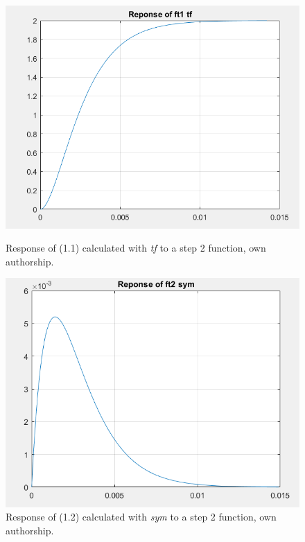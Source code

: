 \documentclass[a4paper,12pt]{article}
\begin{document}
\begin{figure}[H]
    \centering
    \begin{minipage}[b]{0.40\linewidth}
        \centering
        \includegraphics[width=\linewidth]{fonts_lab_1/tf1_response.png}
        \caption{Response of (1.1) calculated with \textit{tf} to a step 2 function, own authorship.}
        \label{fig:tf1-response}
    \end{minipage}
    \hspace{0.05\linewidth} %
    \begin{minipage}[b]{0.40\linewidth}
        \centering
        \includegraphics[width=\linewidth]{fonts_lab_1/sym2_response.png}
        \caption{Response of (1.2) calculated with \textit{sym} to a step 2 function, own authorship.}
        \label{fig:sym2-response}
    \end{minipage}
\end{figure}
\end{document}
